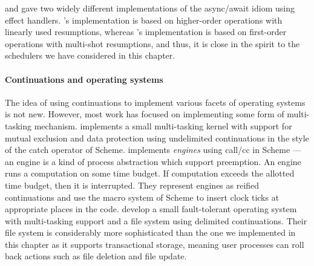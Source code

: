 \documentclass[12pt,phd,lfcs,twoside,openright,logo,leftchapter,normalheadings]{infthesis}
\theoremstyle{plain}
\theoremstyle{definition}
\begin{document}
\citet{DolanEHMSW17} and \citet{Leijen17a} gave two widely different
implementations of the async/await idiom using effect
handlers. \citeauthor{DolanEHMSW17}'s implementation is based on
higher-order operations with linearly used resumptions, whereas
\citeauthor{Leijen17a}'s implementation is based on first-order
operations with multi-shot resumptions, and thus, it is close in the
spirit to the schedulers we have considered in this chapter.

\paragraph{Continuations and operating systems}
The idea of using continuations to implement various facets of
operating systems is not new. However, most work has focused on
implementing some form of multi-tasking mechanism.
%
\citet{Wand80} implements a small multi-tasking kernel with support
for mutual exclusion and data protection using undelimited
continuations in the style of the catch operator of Scheme.
\citet{DybvigH89} implements \emph{engines} using call/cc in Scheme
--- an engine is a kind of process abstraction which support
preemption. An engine runs a computation on some time budget. If
computation exceeds the allotted time budget, then it is
interrupted. They represent engines as reified continuations and use
the macro system of Scheme to insert clock ticks at appropriate places
in the code. %
\citet{KiselyovS07a} develop a small fault-tolerant operating system
with multi-tasking support and a file system using delimited
continuations. Their file system is considerably more sophisticated
than the one we implemented in this chapter as it supports
transactional storage, meaning user processes can roll back actions
such as file deletion and file update.
\end{document}
